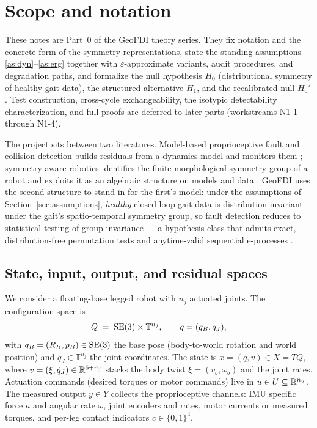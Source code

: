 \section{Scope and notation}
\label{sec:notation}

These notes are Part~0 of the GeoFDI theory series. They fix notation and the
concrete form of the symmetry representations, state the standing assumptions
\ref{as:dyn}--\ref{as:erg} together with $\varepsilon$-approximate variants,
audit procedures, and degradation paths, and formalize the null hypothesis
$H_0$ (distributional symmetry of healthy gait data), the structured
alternative $H_1$, and the recalibrated null $H_0'$. Test construction,
cross-cycle exchangeability, the isotypic detectability characterization, and
full proofs are deferred to later parts (workstreams N1-1 through N1-4).

The project sits between two literatures. Model-based proprioceptive fault and
collision detection builds residuals from a dynamics model and monitors them
\cite{haddadin2017robot,evangelisti2024datadriven}; symmetry-aware robotics
identifies the finite morphological symmetry group of a robot and exploits it
as an algebraic structure on models and data
\cite{ordonez2023discrete,ordonez2025morphological}. GeoFDI uses the second
structure to stand in for the first's model: under the assumptions of
Section~\ref{sec:assumptions}, \emph{healthy} closed-loop gait data is
distribution-invariant under the gait's spatio-temporal symmetry group, so
fault detection reduces to statistical testing of group invariance --- a
hypothesis class that admits exact, distribution-free permutation tests
\cite{hemerik2018exact} and anytime-valid sequential e-processes
\cite{perezortiz2024estatistics}.

\subsection{State, input, output, and residual spaces}
\label{sec:spaces}

We consider a floating-base legged robot with $n_j$ actuated joints. The
configuration space is
\[
  Q \;=\; \mathrm{SE}(3) \times \mathbb{T}^{n_j},
  \qquad q = (q_B, q_J),
\]
with $q_B = (R_{B}, p_{B}) \in \mathrm{SE}(3)$ the base pose (body-to-world rotation
and world position) and $q_J \in \mathbb{T}^{n_j}$ the joint coordinates. The
state is $x = (q, v) \in X = TQ$, where $v = (\xi, \dot q_J) \in \mathbb{R}^{6+n_j}$
stacks the body twist $\xi = (v_b, \omega_b)$ and the joint rates. Actuation
commands (desired torques or motor commands) live in $u \in U \subseteq
\mathbb{R}^{n_u}$. The measured output $y \in Y$ collects the proprioceptive channels:
IMU specific force $a$ and angular rate $\omega$, joint encoders and rates,
motor currents or measured torques, and per-leg contact indicators
$c \in \{0,1\}^{4}$.

